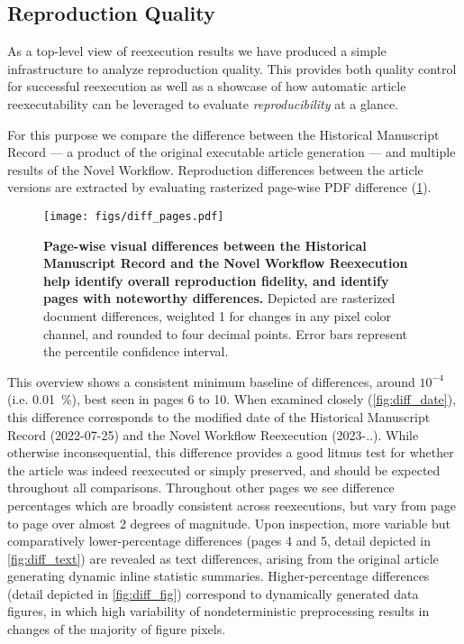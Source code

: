 \subsection{Reproduction Quality}


As a top-level view of reexecution results we have produced a simple infrastructure to analyze reproduction quality.
This provides both quality control for successful reexecution as well as a showcase of how automatic article reexecutability can be leveraged to evaluate \textit{reproducibility} at a glance.

For this purpose we compare the difference between the Historical Manuscript Record — a product of the original executable article generation — and multiple results of the Novel Workflow.
Reproduction differences between the article versions are extracted by evaluating rasterized page-wise PDF difference (\ref{fig:diff_pages}).

\begin{figure}
	\centering
	\texttt{[image: figs/diff\_pages.pdf]}
	\caption{
		\textbf{Page-wise visual differences between the Historical Manuscript Record and the Novel Workflow Reexecution help identify overall reproduction fidelity, and identify pages with noteworthy differences.}
		Depicted are rasterized document differences, weighted 1 for changes in any pixel color channel, and rounded to four decimal points.
		Error bars represent the  percentile confidence interval.
	}
	\label{fig:diff_pages}
\end{figure}

This overview shows a consistent minimum baseline of differences, around $10^{-4}$ (i.e. \SI{0.01}{\percent}), best seen in pages 6 to 10.
When examined closely (\ref{fig:diff_date}), this difference corresponds to the modified date of the Historical Manuscript Record (2022-07-25) and the Novel Workflow Reexecution (2023-..).
While otherwise inconsequential, this difference provides a good litmus test for whether the article was indeed reexecuted or simply preserved, and should be expected throughout all comparisons.
Throughout other pages we see difference percentages which are broadly consistent across reexecutions, but vary from page to page over almost 2 degrees of magnitude.
Upon inspection, more variable but comparatively lower-percentage differences (pages 4 and 5, detail depicted in \cref{fig:diff_text}) are revealed as text differences, arising from the original article generating dynamic inline statistic summaries.
Higher-percentage differences (detail depicted in \cref{fig:diff_fig}) correspond to dynamically generated data figures, in which high variability of nondeterministic preprocessing results in changes of the majority of figure pixels.

